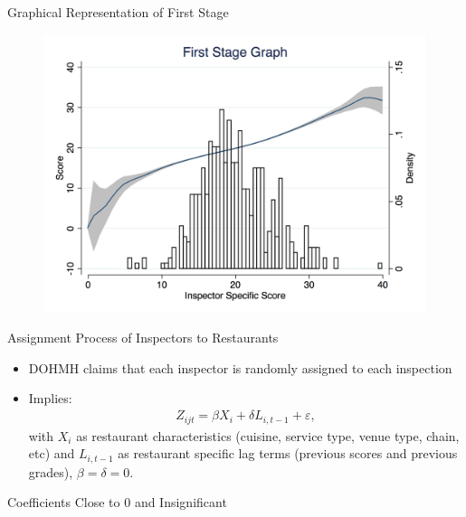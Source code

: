 \documentclass{beamer}
\begin{document}
\begin{frame}{Graphical Representation of First Stage}
    \begin{figure}
        \centering
        \includegraphics[scale = 0.38]{../../Figures/first_stage_score.png}
    \end{figure}
\end{frame}

\begin{frame}{Assignment Process of Inspectors to Restaurants}
\begin{itemize}
\item DOHMH claims that each inspector is randomly assigned to each inspection
\item Implies: 
\begin{align*}
Z_{ijt} = \beta X_i + \delta L_{i,t-1} + \varepsilon,
\end{align*}
with $X_i$ as restaurant characteristics (cuisine, service type, venue type, chain, etc) and $L_{i,t-1}$ as restaurant specific lag terms (previous scores and previous grades), $\beta = \delta = 0$. 

\end{itemize}
\end{frame}

\begin{frame}{Coefficients Close to 0 and Insignificant}
\begin{table}
\scalebox{0.5}{
}
\end{table}
\end{frame}
\end{document}
